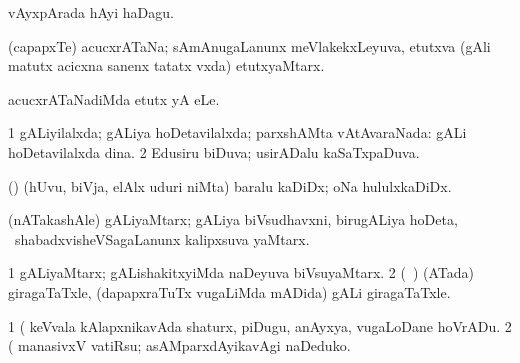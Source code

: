 \bentry
{}
\gl{\nA}
\bmng
vAyxpArada hAyi haDagu. 
\emng
\eentry

\bentry
{} 
\gl{\nA}
\expl{}
\bmng
(capapxTe) acucxrATaNa; sAmAnugaLanunx meVlakekxLeyuva, etutxva (gAli matutx acicxna sanenx tatatx vxda) etutxyaMtarx. 
\emng
\eentry

\bentry
{}
\gl{\sakirx}
\bmng
acucxrATaNadiMda etutx yA eLe. 
\emng
\eentry

\bentry
{} 
\gl{\gu}
\expl{}
\bmng
\bnum
\num{1} gALiyilalxda; gALiya hoDetavilalxda; parxshAMta vAtAvaraNada:  gALi hoDetavilalxda dina. 
\num{2} Edusiru biDuva; usirADalu kaSaTxpaDuva. 
\enum
\emng
\eentry

\bentry
{}
\gl{\nA}
\bmng
(\pArxparx) (hUvu, biVja, elAlx uduri niMta) baralu kaDiDx; oNa hululxkaDiDx. 
\emng
\eentry

\bentry
{}
\gl{\nA}
\bmng
(nATakashAle) gALiyaMtarx; gALiya biVsudhavxni, birugALiya hoDeta, \mo\ shabadxvisheVSagaLanunx kalipxsuva yaMtarx. 
\emng
\eentry

\bentry
{} 
\gl{\nA}
\expl{}
\bmng
\bnum
\num{1} gALiyaMtarx; gALishakitxyiMda naDeyuva biVsuyaMtarx. 
\num{2} (\kanmu\ \birx) (ATada) giragaTaTxle, (dapapxraTuTx \mo vugaLiMda mADida) gALi giragaTaTxle. 
\enum
\emng

\noindent 
\gl{\pagu}
\expl{}
\bmng
\bnum
\num{1}  (  keVvala kAlapxnikavAda shaturx, piDugu, anAyxya, \mo vugaLoDane hoVrADu. 
\num{2}  (  manasivxV vatiRsu; asAMparxdAyikavAgi naDeduko. 
\enum
\emng
\eentry

